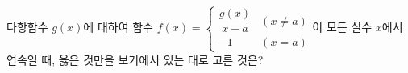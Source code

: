 다항함수 $g(x)$에 대하여 함수 $f(x)=\begin{cases} \dfrac{g(x)}{x-a} & (x\ne a) \\[1ex] -1 & (x=a) \end{cases}$이 모든 실수 $x$에서 연속일 때, 옳은 것만을 보기에서 있는 대로 고른 것은?  
